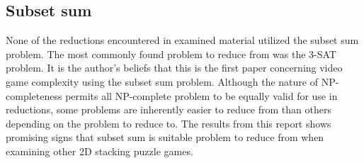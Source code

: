 \subsection{Subset sum}

None of the reductions encountered in examined material utilized the subset sum problem. The most commonly found problem to reduce from was the 3-SAT problem. It is the author's beliefs that this is the first paper concerning video game complexity using the subset sum problem. Although the nature of NP-completeness permits all NP-complete problem to be equally valid for use in reductions, some problems are inherently easier to reduce from than others depending on the problem to reduce to. The results from this report shows promising signs that subset sum is suitable problem to reduce from when examining other 2D stacking puzzle games. 
